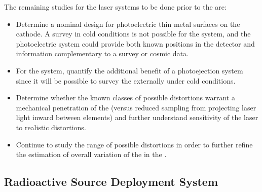 The remaining studies for the laser systems to be done prior to the  are: 
\begin{itemize}
\item Determine a nominal design for photoelectric thin metal surfaces on the cathode. A survey in cold conditions is not possible for the \single system, and the photoelectric system could provide both known positions in the detector and information complementary to a survey or cosmic data.
\item For the \dual system, quantify the additional benefit of a photoejection system since it will be possible to survey the  externally under cold conditions.
\item  Determine whether the known classes of possible \efield distortions warrant a mechanical penetration of the  (versus reduced sampling from projecting laser light inward between  elements) and further understand sensitivity of the laser to realistic \efield distortions. 
\item Continue to study the range of possible \efield distortions in order to further refine the estimation of overall variation of the \efield  in the . 
\end{itemize}

\subsection{Radioactive Source Deployment System}%
\label{sec:calibrs}

